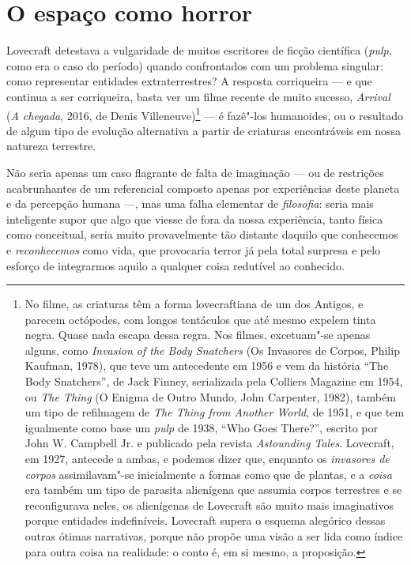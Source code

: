 
\section*{O espaço como horror}

Lovecraft detestava a vulgaridade de muitos escritores de ficção
científica (\emph{pulp}, como era o caso do período) quando confrontados
com um problema singular: como representar entidades extraterrestres? A
resposta corriqueira --- e que continua a ser corriqueira, basta ver um
filme recente de muito sucesso, \emph{Arrival} (\emph{A chegada}, 2016,
de Denis Villeneuve)\footnote{No filme, as criaturas têm a forma
  lovecraftiana de um dos Antigos, e parecem octópodes, com longos
  tentáculos que até mesmo expelem tinta negra. Quase nada escapa dessa
  regra. Nos filmes, excetuam"-se apenas alguns, como \emph{Invasion of
  the Body Snatchers} (Os Invasores de Corpos, Philip Kaufman, 1978),
  que teve um antecedente em 1956 e vem da história ``The Body
  Snatchers'', de Jack Finney, serializada pela Colliers Magazine em
  1954, ou \emph{The Thing} (O Enigma de Outro Mundo, John Carpenter,
  1982), também um tipo de refilmagem de \emph{The Thing from Another
  World}, de 1951, e que tem igualmente como base um \emph{pulp} de
  1938, ``Who Goes There?'', escrito por John W. Campbell Jr. e
  publicado pela revista \emph{Astounding Tales}. Lovecraft, em 1927,
  antecede a ambas, e podemos dizer que, enquanto os \emph{invasores de
  corpos} assimilavam"-se inicialmente a formas como que de plantas, e a
  \emph{coisa} era também um tipo de parasita alienígena que assumia
  corpos terrestres e se reconfigurava neles, os alienígenas de
  Lovecraft são muito mais imaginativos porque entidades indefiníveis.
  Lovecraft supera o esquema alegórico dessas outras ótimas narrativas,
  porque não propõe uma visão a ser lida como índice para outra coisa na
  realidade: o conto é, em si mesmo, a proposição.} --- é fazê"-los
humanoides, ou o resultado de algum tipo de evolução alternativa a
partir de criaturas encontráveis em nossa natureza terrestre.

Não seria apenas um caso flagrante de falta de imaginação --- ou de
restrições acabrunhantes de um referencial composto apenas por
experiências deste planeta e da percepção humana ---, mas uma falha
elementar de \emph{filosofia}: seria mais inteligente supor que algo que
viesse de fora da nossa experiência, tanto física como conceitual, seria
muito provavelmente tão distante daquilo que conhecemos e
\emph{reconhecemos} como vida, que provocaria terror já pela total
surpresa e pelo esforço de integrarmos aquilo a qualquer coisa redutível
ao conhecido.

